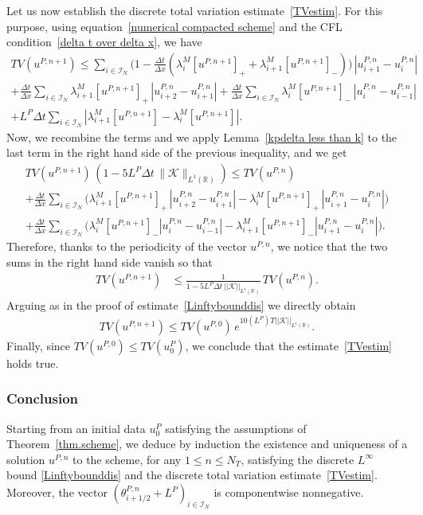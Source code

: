 \documentclass[11pt]{amsart}
\newcommand{\K}{\mathcal{K}}
\newcommand{\R}{\mathbb{R}}
\newcommand{\I}{\mathcal{I}_N}
\begin{document}
Let us now establish the discrete total variation estimate~\eqref{TVestim}. For this purpose, using equation~\eqref{numerical compacted scheme} and the  CFL condition~\eqref{delta t over delta x}, we have
      \begin{multline*}
        TV(u^{P, n+1}) \leq \sum_{i \in\I} \bigg(1 - \frac{\Delta t}{\Delta x}(\lambda^M_i[u^{P, n + 1}]_+ +  \lambda^M_{i + 1} [u^{P, n + 1}]_-)\bigg) \, \left|u_{i + 1}^{P, n} - u_i^{P, n}\right| \\ 
        + \frac{\Delta t}{\Delta x} \sum_{i\in\I} \lambda^M_{i + 1}[u^{P, n + 1}]_+ \, \left|u_{i + 2}^{P, n} - u_{i + 1}^{P, n}\right| + \frac{\Delta t}{\Delta x} \sum_{i\in\I} \lambda^M_i[u^{P, n+ 1}]_- \, \left|u_{i}^{P, n} - u_{i - 1}^{P, n}\right|\\
        + L^P \Delta t \sum_{i\in\I}  \left|\lambda_{i + 1}^M[u^{P, n + 1}] - \lambda^M_i[u^{P, n+ 1}]\right|.
  \end{multline*}
Now, we recombine the terms and we apply Lemma~\ref{kpdelta less than k} to the last term in the right hand side of the previous inequality, and we get
  \begin{multline*}
       TV(u^{P, n+1})\,(1-5L^P \Delta t \, \|\K\|_{L^1(\R)}) \leq TV(u^{P,n}) \\+  \frac{\Delta t}{\Delta x} \sum_{i\in\I} \bigg(\lambda^M_{i + 1} [u^{P, n + 1}]_+\, |u_{i + 2}^{P, n} - u_{i + 1}^{P, n}| - \lambda^M_i[u^{P, n + 1}]_+ \, |u_{i + 1} ^{P, n} - u_i ^{P, n}|\bigg)\\
       +  \frac{\Delta t}{\Delta x} \sum_{i\in\I} \bigg(\lambda^M_i[u^{P, n+ 1}]_- |u_i^{P, n} - u_{i - 1}^{P, n}| - \lambda^M_{i + 1} [u^{P, n + 1}]_-|u_{i + 1}^{P, n} - u_i^{P, n}|\bigg).
  \end{multline*}
Therefore, thanks to the periodicity of the vector $u^{P, n}$, we notice that the two sums in the right hand side vanish so that
\begin{align*}
    TV(u^{P, n+1}) &\leq \frac{1}{1 - 5 L^P \Delta t\, ||\mathcal{K}||_{L^1(\mathbb{R})}} \, TV(u^{P, n}).
\end{align*}
Arguing as in the proof of estimate~\eqref{Linftybounddis} we directly obtain
\begin{align*}
 TV(u^{P, n+1}) \leq TV(u^{P,0}) \, e^{10 (L^P) T ||\mathcal{K}||_{L^1(\mathbb{R})}}.
\end{align*}
Finally, since $TV(u^{P,0}) \leq TV(u^P_0)$, we conclude that the estimate~\eqref{TVestim} holds true. 

\subsubsection{Conclusion} Starting from an initial data $u^P_0$ satisfying the assumptions of Theorem~\ref{thm.scheme}, we deduce by induction the existence and uniqueness of a solution $u^{P,n}$ to the scheme, for any $1\leq n \leq N_T$, satisfying the discrete $L^\infty$ bound \eqref{Linftybounddis} and the discrete total variation estimate~\eqref{TVestim}. Moreover, the vector $(\theta^{P,n}_{i+1/2}+L^P)_{i\in\I}$ is componentwise nonnegative.
\end{document}
